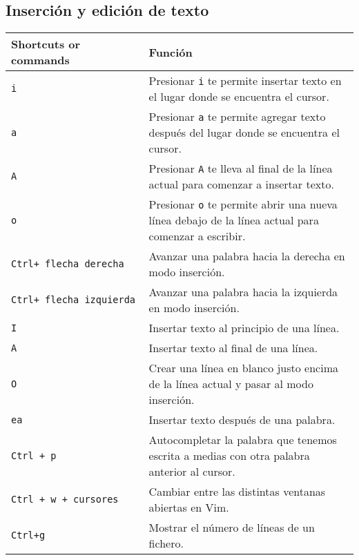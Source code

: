 \documentclass[
  doc,
  floatsintext,
  longtable,
  a4paper,
  nolmodern,
  notxfonts,
  notimes,
  colorlinks=true,linkcolor=blue,citecolor=blue,urlcolor=blue]{apa7}
\begin{document}
\subsection{Inserción y edición de
texto}\label{inserciuxf3n-y-ediciuxf3n-de-texto}

\begin{longtable}[]{@{}
  >{\raggedright\arraybackslash}p{}
  >{\raggedright\arraybackslash}p{}@{}}
\toprule\noalign{}
\begin{minipage}[b]{\linewidth}\raggedright
Shortcuts or commands
\end{minipage} & \begin{minipage}[b]{\linewidth}\raggedright
Función
\end{minipage} \\
\midrule\noalign{}
\endhead
\bottomrule\noalign{}
\endlastfoot
\texttt{i} & Presionar \texttt{i} te permite insertar texto en el lugar
donde se encuentra el cursor. \\
\texttt{a} & Presionar \texttt{a} te permite agregar texto después del
lugar donde se encuentra el cursor. \\
\texttt{A} & Presionar \texttt{A} te lleva al final de la línea actual
para comenzar a insertar texto. \\
\texttt{o} & Presionar \texttt{o} te permite abrir una nueva línea
debajo de la línea actual para comenzar a escribir. \\
\texttt{Ctrl+\ flecha\ derecha} & Avanzar una palabra hacia la derecha
en modo inserción. \\
\texttt{Ctrl+\ flecha\ izquierda} & Avanzar una palabra hacia la
izquierda en modo inserción. \\
\texttt{I} & Insertar texto al principio de una línea. \\
\texttt{A} & Insertar texto al final de una línea. \\
\texttt{O} & Crear una línea en blanco justo encima de la línea actual y
pasar al modo inserción. \\
\texttt{ea} & Insertar texto después de una palabra. \\
\texttt{Ctrl\ +\ p} & Autocompletar la palabra que tenemos escrita a
medias con otra palabra anterior al cursor. \\
\texttt{Ctrl\ +\ w\ +\ cursores} & Cambiar entre las distintas ventanas
abiertas en Vim. \\
\texttt{Ctrl+g} & Mostrar el número de líneas de un fichero. \\
\end{longtable}
\end{document}
